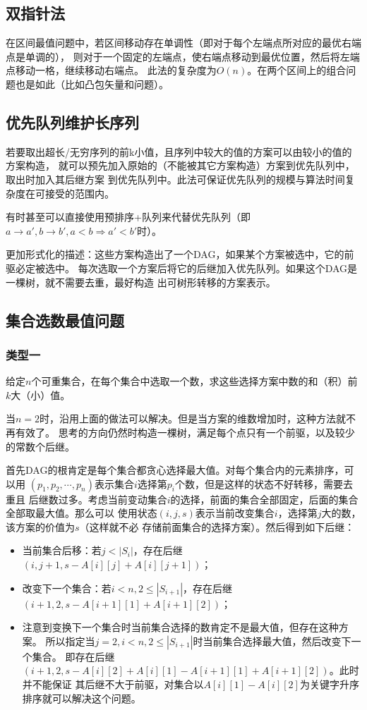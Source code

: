 \subsection{双指针法}
在区间最值问题中，若区间移动存在单调性（即对于每个左端点所对应的最优右端点是单调的），
则对于一个固定的左端点，使右端点移动到最优位置，然后将左端点移动一格，继续移动右端点。
此法的复杂度为$O(n)$。在两个区间上的组合问题也是如此（比如凸包矢量和问题）。
\subsection{优先队列维护长序列}\label{PQS}
若要取出超长/无穷序列的前k小值，且序列中较大的值的方案可以由较小的值的方案构造，
就可以预先加入原始的（不能被其它方案构造）方案到优先队列中，取出时加入其后继方案
到优先队列中。此法可保证优先队列的规模与算法时间复杂度在可接受的范围内。

有时甚至可以直接使用预排序+队列来代替优先队列（即$a\rightarrow a',b\rightarrow b',
	a<b\Rightarrow a'<b'$时）。

更加形式化的描述：这些方案构造出了一个DAG，如果某个方案被选中，它的前驱必定被选中。
每次选取一个方案后将它的后继加入优先队列。如果这个DAG是一棵树，就不需要去重，最好构造
出可树形转移的方案表示。

\subsection{集合选数最值问题}
\subsubsection{类型一}
给定$n$个可重集合，在每个集合中选取一个数，求这些选择方案中数的和（积）前$k$大（小）值。

当$n=2$时，沿用上面的做法可以解决。但是当方案的维数增加时，这种方法就不再有效了。
思考的方向仍然时构造一棵树，满足每个点只有一个前驱，以及较少的常数个后继。

首先DAG的根肯定是每个集合都贪心选择最大值。对每个集合内的元素排序，可以用
$(p_1,p_2,\cdots,p_n)$表示集合$i$选择第$p_i$个数，但是这样的状态不好转移，需要去重且
后继数过多。考虑当前变动集合$i$的选择，前面的集合全部固定，后面的集合全部取最大值。那么可以
使用状态$(i,j,s)$表示当前改变集合$i$，选择第$j$大的数，该方案的价值为$s$（这样就不必
存储前面集合的选择方案）。然后得到如下后继：
\begin{itemize}
	\item 当前集合后移：若$j<|S_i|$，存在后继$(i,j+1,s-A[i][j]+A[i][j+1])$；
	\item 改变下一个集合：若$i<n,2\leq |S_{i+1}|$，存在后继
	$(i+1,2,s-A[i+1][1]+A[i+1][2])$；
	\item 注意到变换下一个集合时当前集合选择的数肯定不是最大值，但存在这种方案。
	所以指定当$j=2,i<n,2\leq |S_{i+1}|$时当前集合选择最大值，然后改变下一个集合。
	即存在后继$(i+1,2,s-A[i][2]+A[i][1]-A[i+1][1]+A[i+1][2])$。此时并不能保证
	其后继不大于前驱，对集合以$A[i][1]-A[i][2]$为关键字升序排序就可以解决这个问题。
\end{itemize}

